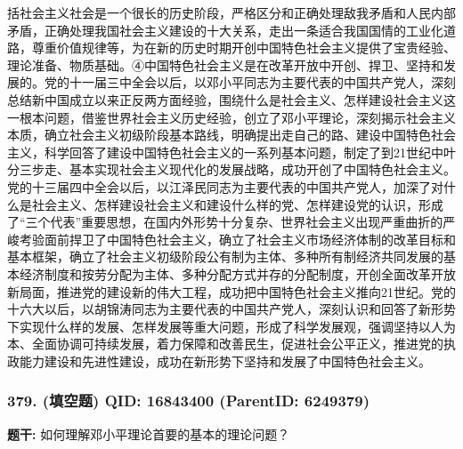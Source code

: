 \documentclass[12pt,UTF8]{ctexart}
\begin{document}
括社会主义社会是一个很长的历史阶段，严格区分和正确处理敌我矛盾和人民内部矛盾，正确处理我国社会主义建设的十大关系，走出一条适合我国国情的工业化道路，尊重价值规律等，为在新的历史时期开创中国特色社会主义提供了宝贵经验、理论准备、物质基础。④中国特色社会主义是在改革开放中开创、捍卫、坚持和发展的。党的十一届三中全会以后，以邓小平同志为主要代表的中国共产党人，深刻总结新中国成立以来正反两方面经验，围绕什么是社会主义、怎样建设社会主义这一根本问题，借鉴世界社会主义历史经验，创立了邓小平理论，深刻揭示社会主义本质，确立社会主义初级阶段基本路线，明确提出走自己的路、建设中国特色社会主义，科学回答了建设中国特色社会主义的一系列基本问题，制定了到21世纪中叶分三步走、基本实现社会主义现代化的发展战略，成功开创了中国特色社会主义。党的十三届四中全会以后，以江泽民同志为主要代表的中国共产党人，加深了对什么是社会主义、怎样建设社会主义和建设什么样的党、怎样建设党的认识，形成了“三个代表”重要思想，在国内外形势十分复杂、世界社会主义出现严重曲折的严峻考验面前捍卫了中国特色社会主义，确立了社会主义市场经济体制的改革目标和基本框架，确立了社会主义初级阶段公有制为主体、多种所有制经济共同发展的基本经济制度和按劳分配为主体、多种分配方式并存的分配制度，开创全面改革开放新局面，推进党的建设新的伟大工程，成功把中国特色社会主义推向21世纪。党的十六大以后，以胡锦涛同志为主要代表的中国共产党人，深刻认识和回答了新形势下实现什么样的发展、怎样发展等重大问题，形成了科学发展观，强调坚持以人为本、全面协调可持续发展，着力保障和改善民生，促进社会公平正义，推进党的执政能力建设和先进性建设，成功在新形势下坚持和发展了中国特色社会主义。

\vspace{0.3em}\hrulefill\vspace{0.7em}

\subsubsection*{379. (填空题) \small QID: 16843400 (ParentID: 6249379)}

\textbf{题干:}
如何理解邓小平理论首要的基本的理论问题？
\end{document}
